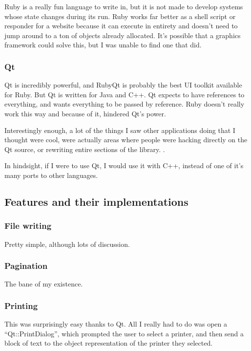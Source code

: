 \documentclass[11pt]{article}
\begin{document}
Ruby is a really fun language to write in, but it is not made to develop systems whose state changes during its run. Ruby works far better as a shell script or responder for a website because it can execute in entirety and doesn't need to jump around to a ton of objects already allocated. It's possible that a graphics framework could solve this, but I was unable to find one that did.

\subsubsection{Qt}

Qt is incredibly powerful, and RubyQt \cite{rubyqt} is probably the best UI toolkit available for Ruby. But Qt is written for Java and C++. Qt expects to have references to everything, and wants everything to be passed by reference. Ruby doesn't really work this way and because of it, hindered Qt's power.

Interestingly enough, a lot of the things I saw other applications doing that I thought were cool, were actually areas where people were hacking directly on the Qt source, or rewriting entire sections of the library. \cite{kwrite}.

In hindsight, if I were to use Qt, I would use it with C++, instead of one of it's many ports to other languages.

\subsection{Features and their implementations}

\subsubsection{File writing}

Pretty simple, although lots of discussion.

\subsubsection{Pagination}

The bane of my existence.

\subsubsection{Printing}

This was surprisingly easy thanks to Qt. All I really had to do was open a ``Qt::PrintDialog'', which prompted the user to select a printer, and then send a block of text to the object representation of the printer they selected.
\end{document}
